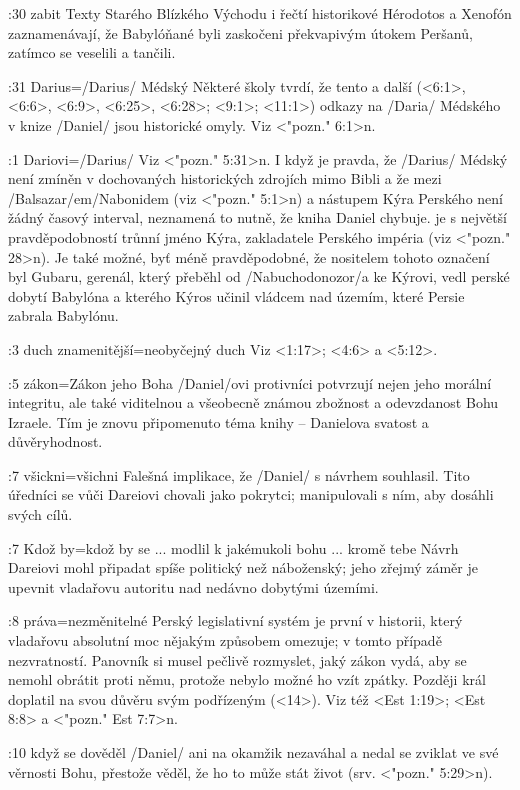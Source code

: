 :30 {zabit} Texty Starého Blízkého Východu i řečtí historikové Hérodotos a Xenofón zaznamenávají, že Babylóňané byli zaskočeni překvapivým útokem Peršanů, zatímco se veselili a tančili.
     
:31 {Darius}={\x/Darius/ Médský} Některé školy tvrdí, že tento a další 
(<6:1>, <6:6>, <6:9>, <6:25>, <6:28>; <9:1>; <11:1>)     
odkazy na \x/Daria/ Médského v knize \x/Daniel/ jsou historické omyly. Viz <"pozn." 6:1>n. 

:1 {Dariovi}={\x/Darius/} Viz <"pozn." 5:31>n.      
I když je pravda, že \x/Darius/ Médský není zmíněn v dochovaných historických zdrojích mimo Bibli a že mezi \x/Balsazar/em/Nabonidem (viz <"pozn." 5:1>n) a nástupem Kýra Perského není žádný časový interval, neznamená to nutně, že kniha Daniel chybuje.  je s největší pravděpodobností trůnní jméno Kýra, zakladatele Perského impéria (viz <"pozn." 28>n). Je také možné, byť méně pravděpodobné, že nositelem tohoto označení byl Gubaru, gerenál, který přeběhl od  \x/Nabuchodonozor/a ke Kýrovi, vedl perské dobytí Babylóna a kterého  Kýros učinil vládcem nad územím, které Persie zabrala Babylónu. 

:3 {duch znamenitější}={neobyčejný duch} Viz  <1:17>;  <4:6> a <5:12>.

:5 {zákon}={Zákon jeho Boha}  \x/Daniel/ovi protivníci potvrzují nejen jeho morální integritu, ale také viditelnou a všeobecně známou zbožnost a odevzdanost Bohu Izraele. Tím je znovu připomenuto téma knihy -- Danielova svatost a důvěryhodnost.

:7 {všickni}={všichni} Falešná implikace, že \x/Daniel/ s návrhem souhlasil. Tito úředníci se vůči Dareiovi chovali jako pokrytci; manipulovali s ním, aby dosáhli svých cílů.   

:7 {Kdož by}={kdož by se ... modlil k jakémukoli bohu ... kromě tebe} Návrh Dareiovi mohl připadat spíše politický než náboženský; jeho zřejmý záměr je upevnit vladařovu autoritu nad nedávno dobytými územími. 

:8 {práva}={nezměnitelné} Perský legislativní systém je první v historii, který vladařovu absolutní moc nějakým způsobem omezuje; v tomto případě nezvratností. Panovník si musel pečlivě rozmyslet, jaký zákon vydá, aby se nemohl obrátit proti němu, protože nebylo možné ho vzít zpátky.
Později král doplatil na svou důvěru svým podřízeným (<14>).
Viz též <Est 1:19>;  <Est 8:8> a <"pozn." Est 7:7>n.

:10 {když se dověděl}  \x/Daniel/ ani na okamžik nezaváhal a nedal se zviklat ve své věrnosti Bohu, přestože věděl, že ho to může stát život (srv. <"pozn." 5:29>n). 

